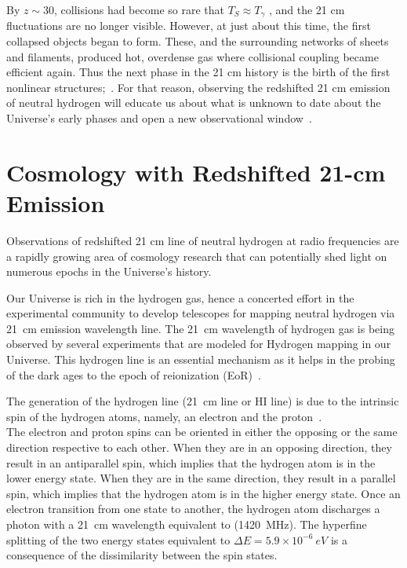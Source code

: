 \documentclass[12pt,a4paper]{report}
\begin{document}
	    By $z\sim 30$, collisions had become so rare that $T_S$$\approx$$T_\gamma$ , and the 21 cm fluctuations are no longer visible. However, at just about this time, the first collapsed objects began to form. These, and the surrounding networks of sheets and filaments, produced hot, overdense gas where collisional coupling became efficient again. Thus the next phase in the 21 cm history is the birth of the first nonlinear structures;~\citep{2006PhR...433..181F}. For that reason, observing the redshifted 21 cm emission of neutral hydrogen will educate us about what is unknown to date about the Universe's early phases and open a new observational window~\citep{2015aska.confE...1K}.  
	    
	\section{Cosmology with Redshifted 21-cm Emission}
	
	
	
	Observations of redshifted 21 cm line of neutral hydrogen at radio frequencies are a rapidly growing area of cosmology research that can potentially shed light on numerous epochs in the Universe's history.

	Our Universe is rich in the hydrogen gas, hence a
	concerted effort in the experimental community to develop telescopes for mapping neutral hydrogen via \SI{21}{cm} emission wavelength line. The \SI{21}{cm} wavelength of hydrogen gas is being observed by several experiments that are modeled for Hydrogen mapping in our Universe. This hydrogen line is an essential mechanism as it helps in the probing of the dark ages to the epoch of reionization (EoR)~\citep{2013PhRvD..87d3002L,2014ApJ...782...66P}.
	
	The generation of the hydrogen line (\SI{21}{cm} line or HI line) is due to the intrinsic spin of the hydrogen atoms, namely, an electron and the proton~\citep{book:832129}.\\
	
	The electron and proton spins can be oriented in either the opposing or the same direction respective to each other. When they are in an opposing direction, they result in an antiparallel spin, which implies that the hydrogen atom is in the lower energy state. When they are in the same direction, they result in a parallel spin, which implies that the hydrogen atom is in the higher energy state. Once an electron transition from one state to another, the hydrogen atom discharges a photon with a \SI{21}{cm} wavelength equivalent to (\SI{1420}{MHz}). The hyperfine splitting of the two energy states equivalent to \(\Delta E =  5.9 \times 10^{-6} \ eV\) is a consequence of the dissimilarity between the spin states.
		
\end{document}
